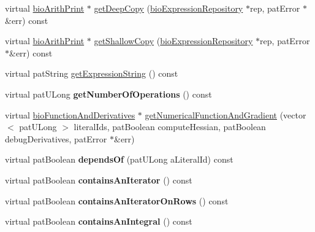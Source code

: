 \begin{DoxyCompactItemize}
\item 
virtual \hyperlink{classbio_arith_print}{bio\+Arith\+Print} $\ast$ \hyperlink{classbio_arith_print_a1a04e77640bd147c7a10d450d779ef1b}{get\+Deep\+Copy} (\hyperlink{classbio_expression_repository}{bio\+Expression\+Repository} $\ast$rep, pat\+Error $\ast$\&err) const
\item 
virtual \hyperlink{classbio_arith_print}{bio\+Arith\+Print} $\ast$ \hyperlink{classbio_arith_print_ac6387b4dbe1741adbc9343cef406b0c0}{get\+Shallow\+Copy} (\hyperlink{classbio_expression_repository}{bio\+Expression\+Repository} $\ast$rep, pat\+Error $\ast$\&err) const
\item 
virtual pat\+String \hyperlink{classbio_arith_print_ac850d47bf3a4d8dcf10d4b943a325103}{get\+Expression\+String} () const
\item 
\mbox{\label{classbio_arith_print_aa43bcf71033b8d7e1ebdbc848b35d5d1}} 
virtual pat\+U\+Long {\bfseries get\+Number\+Of\+Operations} () const
\item 
virtual \hyperlink{classbio_function_and_derivatives}{bio\+Function\+And\+Derivatives} $\ast$ \hyperlink{classbio_arith_print_a22180a362c2407a7941b465598981e96}{get\+Numerical\+Function\+And\+Gradient} (vector$<$ pat\+U\+Long $>$ literal\+Ids, pat\+Boolean compute\+Hessian, pat\+Boolean debug\+Derivatives, pat\+Error $\ast$\&err)
\item 
\mbox{\label{classbio_arith_print_abe786c303fcb2ccc921e492c0de4cc34}} 
virtual pat\+Boolean {\bfseries depends\+Of} (pat\+U\+Long a\+Literal\+Id) const
\item 
\mbox{\label{classbio_arith_print_a13d857f722bf5aeb3b418e2417387eae}} 
virtual pat\+Boolean {\bfseries contains\+An\+Iterator} () const
\item 
\mbox{\label{classbio_arith_print_ab4408176c0cb2d66a20d08ef6ca7ca2c}} 
virtual pat\+Boolean {\bfseries contains\+An\+Iterator\+On\+Rows} () const
\item 
\mbox{\label{classbio_arith_print_ac89f15c6ecee778da12604c2c31b1ae4}} 
virtual pat\+Boolean {\bfseries contains\+An\+Integral} () const
\item 
\mbox{\label{classbio_arith_print_a8756a0405faa4e47236ddebd6ffcb561}} 

\end{DoxyCompactItemize}
